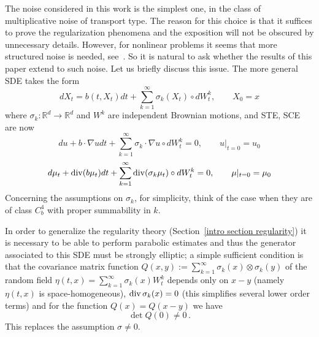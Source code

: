 \documentclass[a4paper,10pt]{article}
\def\func#1{\mathop{\rm #1}}
\begin{document}
The noise considered in this work is the simplest one, in the class of
multiplicative noise of transport type. The reason for this choice is that
it suffices to prove the regularization phenomena and the exposition will
not be obscured by unnecessary details. However, for nonlinear problems it
seems that more structured noise is needed, see~\cite{FLAGUBPRI10a,DeFlVi}. 
So it is natural to ask whether the results of this paper extend to such
noise. Let us briefly discuss this issue. The more general SDE takes the
form 
\begin{equation}
dX_{t}=b( t,X_{t}) dt+\sum_{k=1}^{\infty }\sigma _{k}(
X_{t}) \circ dW_{t}^{k},\qquad X_{0}=x  \label{SDE general}
\end{equation}
where $\sigma _{k}:\mathbb{R}^{d}\rightarrow \mathbb{R}^{d}$ and $W^{k}$ are
independent Brownian motions, and STE, SCE are now
\begin{equation}
du+b\cdot \nabla udt+\sum_{k=1}^{\infty }\sigma _{k}\cdot \nabla u\circ
dW_{t}^{k}=0,\qquad u|_{t=0}=u_{0}  \label{stoch transport general}
\end{equation}
\begin{equation}
d\mu _{t}+\func{div}( b\mu _{t}) dt+\sum_{k=1}^{\infty }\func{div} 
( \sigma _{k}\mu _{t}) \circ dW_{t}^{k}=0,\qquad \mu |_{t=0}=\mu
_{0}  \label{stoch cont general}
\end{equation} 
Concerning the assumptions on $\sigma _{k}$, for simplicity, think of the
case when they are of class $C_{b}^{4}$ with proper summability in $k$. 

In order to generalize the regularity theory (Section~\ref{intro section
regularity}) it is necessary to be able to perform parabolic estimates and
thus the generator associated to this SDE must be strongly elliptic; a
simple sufficient condition is that the covariance matrix function $Q(
x,y) :=\sum_{k=1}^{\infty }\sigma _{k}( x) \otimes \sigma
_{k}( y) $ of the random field $\eta ( t,x)
=\sum_{k=1}^{\infty }\sigma _{k}( x) W_{t}^{k}$ depends only on $ 
x-y$ (namely $\eta ( t,x) $ is space-homogeneous), $\func{div} 
\sigma _{k}( x) =0$ (this simplifies several lower order terms)
and for the function $Q( x) =Q( x-y) $ we have 
\begin{equation*}
\det Q( 0) \neq 0 \, .
\end{equation*} 
This replaces the assumption $\sigma \neq 0$.
\end{document}
